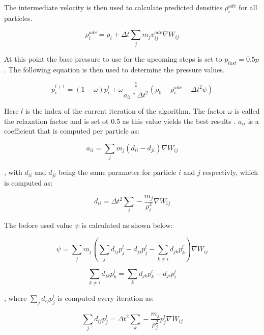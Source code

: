 \documentclass[intern]{cgMA}
\begin{document}
    The intermediate velocity is then used to calculate predicted densities $\rho_i^{adv}$ for all particles. \cite{6570475}

    \begin{equation}
        \rho_i^{adv} = \rho_i + \Delta t \sum_j m_j v_{ij}^{adv} \nabla W_{ij}
    \end{equation}
    
    At this point the base pressure to use for the upcoming steps is set to $p_{last} = 0.5p$ \cite{6570475}. The following equation is then used to determine the pressure values.

    \begin{equation}
        p_i^{l+1} = (1 - \omega) p_i^l + \omega \frac{1}{a_{ii} * \Delta t^2} (\rho_0 - \rho_i^{adv} - \Delta t^2 \psi)
    \end{equation}

    Here $l$ is the index of the current iteration of the algorithm. The factor $\omega$ is called the relaxation factor and is set ot $0.5$ as this value yields the best results \cite{6570475}. $a_{ii}$ is a coefficient that is computed per particle as: 

    \begin{equation}
        a_{ii} = \sum_j m_j (d_{ii} - d_{ji}) \nabla W_{ij}
    \end{equation}

    , with $d_{ii}$ and $d_{ji}$ being the same parameter for particle $i$ and $j$ respectivly, which is computed as:

    \begin{equation}
        d_{ii} = \Delta t^2 \sum_j -\frac{m_j}{\rho_i^2} \nabla W_{ij}
    \end{equation}

    The before used value $\psi$ is calculated as shown below:

    \begin{equation}
        \psi = \sum_j m_j (\sum_j d_{ij}p_j^l - d_{jj}p_j^l - \sum_{k \neq i} d_{jk}p_k^l) \nabla W_{ij}
    \end{equation}

    \begin{equation}
        \sum_{k \neq i} d_{jk}p_k^l = \sum_{k} d_{jk}p_k^l - d_{ji}p_i^l 
    \end{equation}

    , where $\sum_j d_{ij}p_j^l$ is computed every iteration as:

    \begin{equation}
        \sum_j d_{ij}p_j^l = \Delta t^2 \sum_{k} -\frac{m_j}{\rho_j^2} p_j^l \nabla W_{ij}
    \end{equation}
\end{document}
